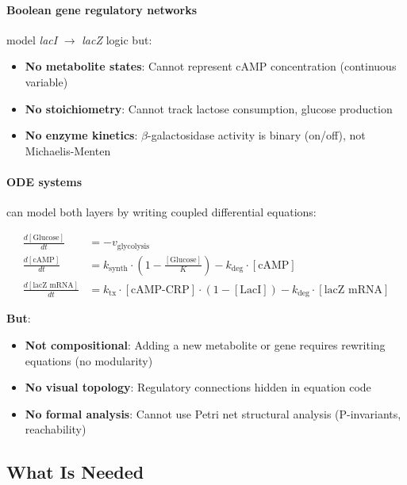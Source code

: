 \paragraph{Boolean gene regulatory networks} model \emph{lacI} $\to$ \emph{lacZ} logic but:

\begin{itemize}
    \item \textbf{No metabolite states}: Cannot represent cAMP concentration (continuous variable)
    \item \textbf{No stoichiometry}: Cannot track lactose consumption, glucose production
    \item \textbf{No enzyme kinetics}: $\beta$-galactosidase activity is binary (on/off), not Michaelis-Menten
\end{itemize}

\paragraph{ODE systems} can model both layers by writing coupled differential equations:

\begin{equation}
\begin{aligned}
\frac{d[\text{Glucose}]}{dt} &= -v_{\text{glycolysis}} \\
\frac{d[\text{cAMP}]}{dt} &= k_{\text{synth}} \cdot \left(1 - \frac{[\text{Glucose}]}{K}\right) - k_{\text{deg}} \cdot [\text{cAMP}] \\
\frac{d[\text{lacZ mRNA}]}{dt} &= k_{\text{tx}} \cdot [\text{cAMP-CRP}] \cdot (1 - [\text{LacI}]) - k_{\text{deg}} \cdot [\text{lacZ mRNA}]
\end{aligned}
\end{equation}

\textbf{But}:

\begin{itemize}
    \item \textbf{Not compositional}: Adding a new metabolite or gene requires rewriting equations (no modularity)
    \item \textbf{No visual topology}: Regulatory connections hidden in equation code
    \item \textbf{No formal analysis}: Cannot use Petri net structural analysis (P-invariants, reachability)
\end{itemize}

\subsection{What Is Needed}
\label{subsec:lac-operon-requirements}

